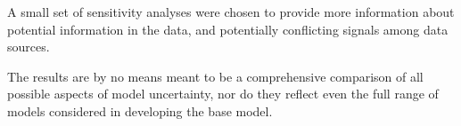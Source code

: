 \documentclass[11pt,
  english,
  a4paper,
]{article}
\begin{document}
\leavevmode\tagmcend\tagstructend\par

A small set of sensitivity analyses were chosen to provide more information about potential information in the data, and potentially conflicting signals among data sources.

The results are by no means meant to be a comprehensive comparison of all possible aspects of model uncertainty, nor do they reflect even the full range of models considered in developing the base model.

\leavevmode\tagmcend\tagstructend\par
\end{document}
